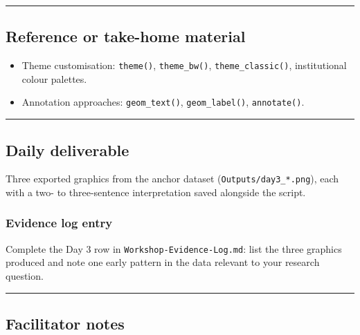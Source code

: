 \documentclass[11pt]{article}
\providecommand{\tightlist}{%
  \setlength{\itemsep}{0pt}\setlength{\parskip}{0pt}}
\begin{document}
\begin{center}\rule{0.5\linewidth}{0.5pt}\end{center}

\hypertarget{reference-or-take-home-material}{%
\subsection{Reference or take-home
material}\label{reference-or-take-home-material}}

\begin{itemize}
\tightlist
\item
  Theme customisation: \texttt{theme()}, \texttt{theme\_bw()},
  \texttt{theme\_classic()}, institutional colour palettes.
\item
  Annotation approaches: \texttt{geom\_text()}, \texttt{geom\_label()},
  \texttt{annotate()}.
\end{itemize}

\begin{center}\rule{0.5\linewidth}{0.5pt}\end{center}

\hypertarget{daily-deliverable}{%
\subsection{Daily deliverable}\label{daily-deliverable}}

Three exported graphics from the anchor dataset
(\texttt{Outputs/day3\_*.png}), each with a two- to three-sentence
interpretation saved alongside the script.

\hypertarget{evidence-log-entry}{%
\subsubsection{Evidence log entry}\label{evidence-log-entry}}

Complete the Day 3 row in \texttt{Workshop-Evidence-Log.md}: list the
three graphics produced and note one early pattern in the data relevant
to your research question.

\begin{center}\rule{0.5\linewidth}{0.5pt}\end{center}

\hypertarget{facilitator-notes}{%
\subsection{Facilitator notes}\label{facilitator-notes}}
\end{document}
